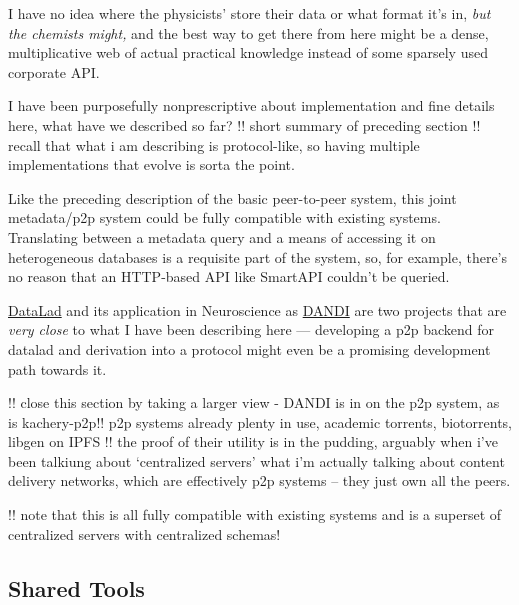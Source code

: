 \documentclass[10pt]{article}
\begin{document}
\begin{multicols}{2}
I have no idea where the physicists' store their data or what format
it's in, \emph{but the chemists might,} and the best way to get there
from here might be a dense, multiplicative web of actual practical
knowledge instead of some sparsely used corporate API.

I have been purposefully nonprescriptive about implementation and fine
details here, what have we described so far? !! short summary of
preceding section !! recall that what i am describing is protocol-like,
so having multiple implementations that evolve is sorta the point.

Like the preceding description of the basic peer-to-peer system, this
joint metadata/p2p system could be fully compatible with existing
systems. Translating between a metadata query and a means of accessing
it on heterogeneous databases is a requisite part of the system, so, for
example, there's no reason that an HTTP-based API like SmartAPI couldn't
be queried.

\href{https://www.datalad.org/}{DataLad} \cite{halchenkoDataLadDistributedSystem2021, hankeDefenseDecentralizedResearch2021}  and its application in
Neuroscience as \href{https://dandiarchive.org}{DANDI} are two projects
that are \emph{very close} to what I have been describing here ---
developing a p2p backend for datalad and derivation into a protocol
might even be a promising development path towards it.

!! close this section by taking a larger view - \cite{langilleBioTorrentsFileSharing2010}  DANDI is in on the p2p system,
as is kachery-p2p!! p2p systems already plenty in use, academic
torrents, biotorrents, libgen on IPFS !! the proof of their utility is
in the pudding, arguably when i've been talkiung about `centralized
servers' what i'm actually talking about content delivery networks,
which are effectively p2p systems -- they just own all the peers.

!! note that this is all fully compatible with existing systems and is a
superset of centralized servers with centralized schemas! 
\end{multicols}


\hypertarget{shared-tools}{%
\subsection{Shared Tools}\label{shared-tools}}
\end{document}
